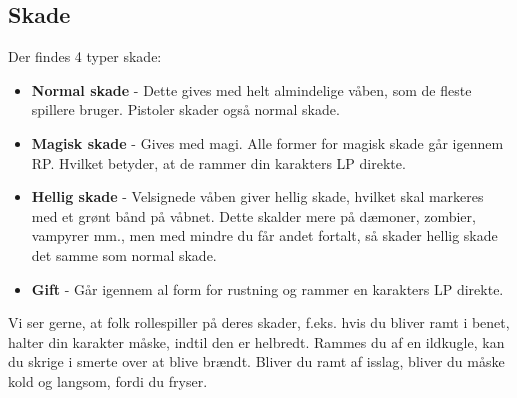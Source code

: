 \subsection*{Skade}
Der findes 4 typer skade:
\begin{itemize}
    \item \textbf{Normal skade} - Dette gives med helt almindelige våben, som de fleste spillere bruger. Pistoler skader også normal skade.
    \item \textbf{Magisk skade} - Gives med magi. Alle former for magisk skade går igennem RP. Hvilket betyder, at de rammer din karakters LP direkte.
    \item \textbf{Hellig skade} - Velsignede våben giver hellig skade, hvilket skal markeres med et grønt bånd på våbnet. Dette skalder mere på dæmoner, zombier, vampyrer mm., men med mindre du får andet fortalt, så skader hellig skade det samme som normal skade.
    \item \textbf{Gift} - Går igennem al form for rustning og rammer en karakters LP direkte.
\end{itemize}
Vi ser gerne, at folk rollespiller på deres skader, f.eks. hvis du bliver ramt i benet, halter din karakter måske, indtil den er helbredt. Rammes du af en ildkugle, kan du skrige i smerte over at blive brændt. Bliver du ramt af isslag, bliver du måske kold og langsom, fordi du fryser.

